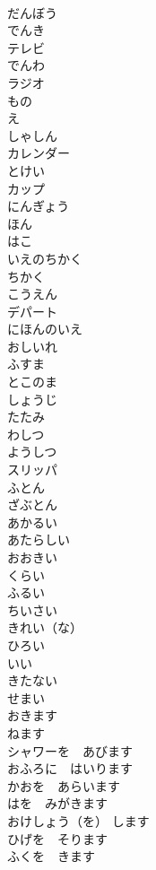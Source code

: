 \documentclass[8pt]{extreport}
\begin{document}
\begin{CJK}{UTF8}{min}
\\	だんぼう	
\\	でんき	
\\	テレビ	
\\	でんわ	
\\	ラジオ	
\\	もの	
\\	え	
\\	しゃしん	
\\	カレンダー	
\\	とけい	
\\	カップ	
\\	にんぎょう	
\\	ほん	
\\	はこ	
\\	いえのちかく	
\\	ちかく	
\\	こうえん	
\\	デパート	
\\	にほんのいえ	
\\	おしいれ	
\\	ふすま	
\\	とこのま	
\\	しょうじ	
\\	たたみ	
\\	わしつ	
\\	ようしつ	
\\	スリッパ	
\\	ふとん	
\\	ざぶとん	
\\	あかるい	
\\	あたらしい	
\\	おおきい	
\\	くらい	
\\	ふるい	
\\	ちいさい	
\\	きれい（な）	
\\	ひろい	
\\	いい	
\\	きたない	
\\	せまい	
\\	おきます	
\\	ねます	
\\	シャワーを　あびます	
\\	おふろに　はいります	
\\	かおを　あらいます	
\\	はを　みがきます	
\\	おけしょう（を） します	
\\	ひげを　そります	
\\	ふくを　きます	

\end{CJK}
\end{document}
